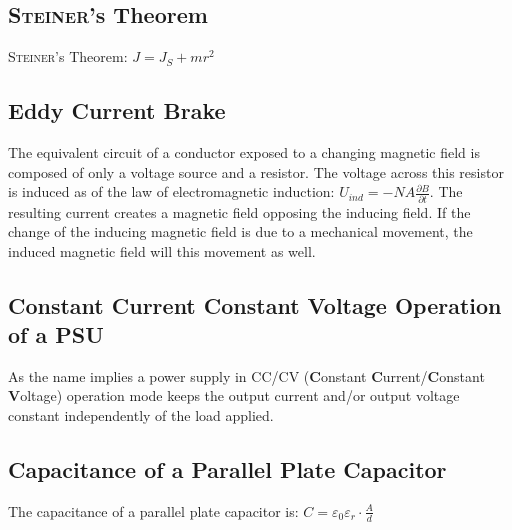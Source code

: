     \subsection*{\textsc{Steiner}'s Theorem}
        \textsc{Steiner}'s Theorem: \(J = J_S + mr^2\)
    \subsection*{Eddy Current Brake}
        The equivalent circuit of a conductor exposed to a changing magnetic field is composed of only a voltage source
        and a resistor. The voltage across this resistor is induced as of the law of electromagnetic induction: \(U_{ind} = -NA\frac{\partial B}{\partial t}\).
        The resulting current creates a magnetic field opposing the inducing field. If the change of the inducing magnetic
        field is due to a mechanical movement, the induced magnetic field will this movement as well.
    \subsection*{Constant Current Constant Voltage Operation of a PSU}
        As the name implies a power supply in CC/CV (\textbf{C}onstant \textbf{C}urrent/\textbf{C}onstant \textbf{V}oltage)
        operation mode keeps the output current and/or output voltage constant independently of the load applied.
    \subsection*{Capacitance of a Parallel Plate Capacitor}\label{sec:capacitance of a parallel plate capacitor}
        The capacitance of a parallel plate capacitor is: \(C = \varepsilon_0 \varepsilon_r \cdot \frac{A}{d}\)

